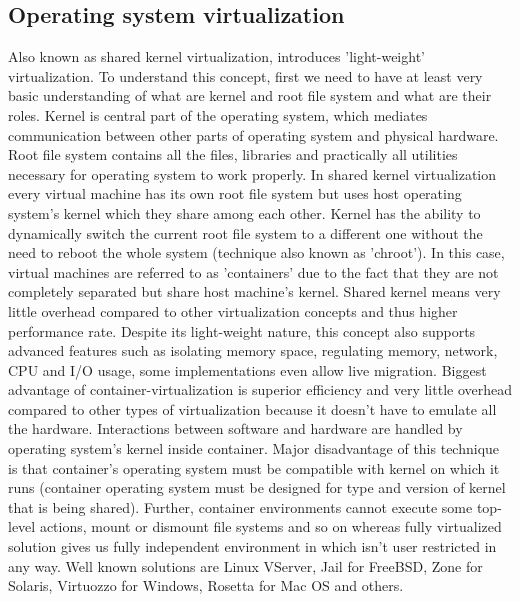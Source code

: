 \subsection{Operating system virtualization} \label{os_virt}
Also known as shared kernel virtualization, introduces 'light-weight' virtualization. To understand this concept, first we need to have at least very basic understanding of what are kernel and root file system and what are their roles. Kernel is central part of the operating system, which mediates communication between other parts of operating system and physical hardware. Root file system contains all the files, libraries and practically all utilities necessary for operating system to work properly. In shared kernel virtualization every virtual machine has its own root file system but uses host operating system's kernel which they share among each other. Kernel has the ability to dynamically switch the current root file system to a different one without the need to reboot the whole system (technique also known as 'chroot'). In this case, virtual machines are referred to as 'containers' due to the fact that they are not completely separated but share host machine's kernel. Shared kernel means very little overhead compared to other virtualization concepts and thus higher performance rate. Despite its light-weight nature, this concept also supports advanced features such as isolating memory space, regulating memory, network, CPU and I/O usage, some implementations even allow live migration. Biggest advantage of container-virtualization is superior efficiency and very little overhead compared to other types of virtualization because it doesn't have to emulate all the hardware. Interactions between software and hardware are handled by operating system's kernel inside container. Major disadvantage of this technique is that container's operating system must be compatible with kernel on which it runs (container operating system must be designed for type and version of kernel that is being shared). Further, container environments cannot execute some top-level actions, mount or dismount file systems and so on whereas fully virtualized solution gives us fully independent environment in which isn't user restricted in any way.
Well known solutions are Linux VServer, Jail for FreeBSD, Zone for Solaris, Virtuozzo for Windows, Rosetta for Mac OS and others.


